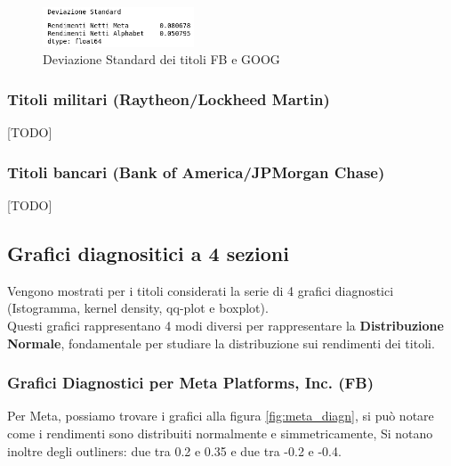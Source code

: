 \documentclass{article}
\begin{document}
\begin{figure}[h]
  \centering
  \includegraphics[width=0.4\textwidth]{ds_tecno.png}
  \caption{Deviazione Standard dei titoli FB e GOOG}
  \label{fig:ds_tecno}
\end{figure}

\subsubsection{Titoli militari (Raytheon/Lockheed Martin)}

[TODO]

\subsubsection{Titoli bancari (Bank of America/JPMorgan Chase)}

[TODO]

\pagebreak

\subsection{Grafici diagnositici a 4 sezioni}

Vengono mostrati per i titoli considerati la serie di 4 grafici diagnostici (Istogramma, kernel density, qq-plot e boxplot).\\
Questi grafici rappresentano 4 modi diversi per rappresentare la \textbf{Distribuzione Normale}, fondamentale per studiare la distribuzione sui rendimenti dei titoli.

\subsubsection{Grafici Diagnostici per Meta Platforms, Inc. (FB)}

Per Meta, possiamo trovare i grafici alla figura \ref{fig:meta_diagn}, si può notare come i rendimenti sono distribuiti normalmente e simmetricamente,
Si notano inoltre degli outliners: due tra 0.2 e 0.35 e due tra -0.2 e -0.4.
\end{document}

